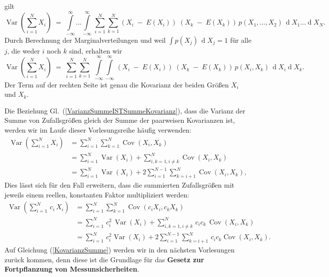 gilt
\begin{equation}
\operatorname {Var}\left(\sum _{{i=1}}^{N}X_{i}\right) \; = \;
\int\limits_{-\infty}^{\infty} \dots \int\limits_{-\infty}^{\infty}
\, \sum_{i=1}^N \sum_{k=1}^N  \left(X_i \; - \; E(X_i)\right) \;
\left(X_k \; - \; E(X_k)\right) \, p(X_1, \dots, X_2)
\, \operatorname{d}X_1 \dots \operatorname{d}X_N .
\end{equation}
Durch Berechnung der Marginalverteilungen und weil $\int p(X_j) \, \operatorname{d}X_j = 1$
für alle $j$, die weder $i$ noch $k$ sind, erhalten wir
\begin{equation}
\operatorname {Var}\left(\sum _{{i=1}}^{N}X_{i}\right) \; = \;
\sum_{i=1}^N \sum_{k=1}^N  \;
\int\limits_{-\infty}^{\infty} \int\limits_{-\infty}^{\infty}
\, \left(X_i \; - \; E(X_i)\right) \;
\left(X_k \; - \; E(X_k)\right) \, p(X_i, X_k)
\, \operatorname{d}X_i \operatorname{d}X_k .
\end{equation}
Der Term auf der rechten Seite ist genau die Kovarianz der beiden 
Größen $X_i$ und $X_k$.

Die Beziehung Gl.~(\ref{VarianzSummeISTSummeKovarianz}), dass die
Varianz der Summe von Zufallsgrößen gleich der Summe der paarweisen Kovarianzen
ist, werden wir im Laufe dieser Vorlesungsreihe häufig
verwenden:
\begin{equation}
{\begin{aligned}\operatorname {Var}\left(\sum _{{i=1}}^{N}X_{i}\right) & 
	= \sum _{i=1}^{N}\sum _{k=1}^{N}\operatorname {Cov}(X_{i},X_{k})\\
	& = \sum _{{i=1}}^{N}\operatorname {Var}(X_{i})+
	\sum _{{i,k=1,i\neq k}}^{N}\operatorname {Cov}(X_{i},X_{k})\\
	& = \sum _{i=1}^{N}\operatorname {Var}(X_{i})+2\sum _{{i=1}}^{{N-1}}
	\sum _{k=i+1}^{N}\operatorname {Cov}(X_{i},X_{k}) ,
	\end{aligned}}
\label{VarianzSummeX2Kovarianz}
\end{equation}
Dies lässt sich für den Fall erweitern, dass die summierten Zufallsgrößen mit jeweils einem reellen,
konstanten Faktor multipliziert werden:
\begin{equation}
{\begin{aligned}\operatorname {Var}\left(\sum _{{i=1}}^{N} \, c_i \, X_{i}\right) & 
	= \sum _{i=1}^{N}\sum _{k=1}^{N}\operatorname {Cov}(c_i X_{i}, c_k X_{k})\\
	& = \sum _{{i=1}}^{N} \, c_i^2 \, \operatorname {Var}(X_{i})+
	\sum _{{i,k=1,i\neq k}}^{N} \, c_i c_k \,  \operatorname {Cov}(X_{i},X_{k})\\
	& = \sum _{{i=1}}^{N} \, c_i^2 \operatorname {Var}(X_{i})+2\sum _{{i=1}}^{{N-1}}
	\sum _{{k=i+1}}^{N} \, c_i c_k \operatorname {Cov}(X_{i},X_{k}).
	\end{aligned}}
\label{KovarianzSumme}
\end{equation}
Auf Gleichung (\ref{KovarianzSumme}) werden wir in den nächsten Vorlesungen zurück kommen,
denn diese ist die Grundlage für das \textbf{Gesetz zur Fortpflanzung von Messunsicherheiten}.

